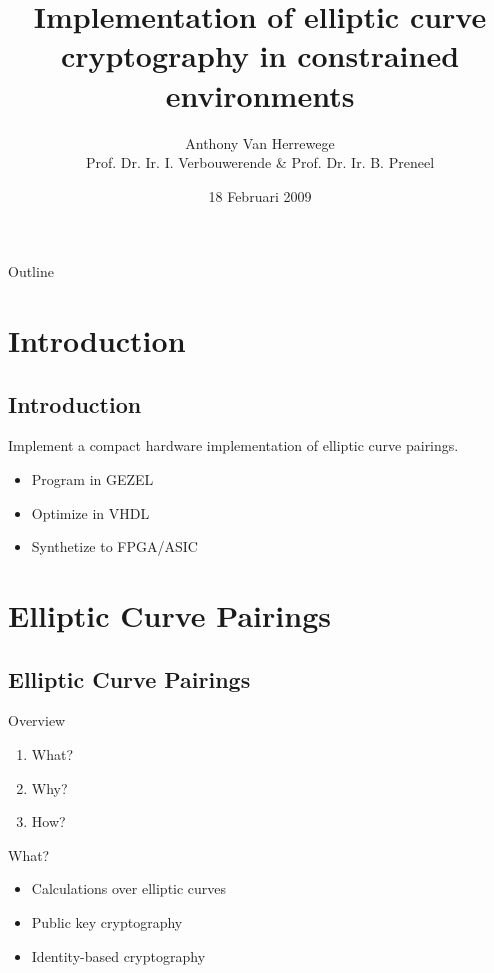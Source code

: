 \documentclass{beamer}
\title{Implementation of elliptic curve cryptography in constrained environments}
\author[Anthony Van Herrewege]{Anthony Van Herrewege\\Prof. Dr. Ir. I. Verbouwerende \& Prof. Dr. Ir. B. Preneel}
\date{18 Februari 2009}
\begin{document}
\frame{\titlepage}

\section[Outline]{}
\begin{frame}{Outline}
  \tableofcontents
\end{frame}

\section{Introduction}
\subsection*{Introduction}
\begin{frame}
	\begin{center}
		Implement a \alert{compact} \alert{hardware} implementation of \alert{elliptic curve pairings}.
		
		\begin{itemize}
			\item<2-> Program in GEZEL
			\item<2-> Optimize in VHDL
			\item<2-> Synthetize to FPGA/ASIC
		\end{itemize}
	\end{center}
\end{frame}

\section{Elliptic Curve Pairings}
\subsection*{Elliptic Curve Pairings}
\begin{frame}{Overview}
	\begin{enumerate}
		\item<1-> What?
		\item<1-> Why?
		\item<1-> How?
	\end{enumerate}
\end{frame}

\begin{frame}{What?}
  \begin{itemize}
    \item<1-> Calculations over elliptic curves
    \item<2-> Public key cryptography
    \item<3-> \alert{Identity}-based cryptography
  \end{itemize}
\end{frame}
\end{document}
